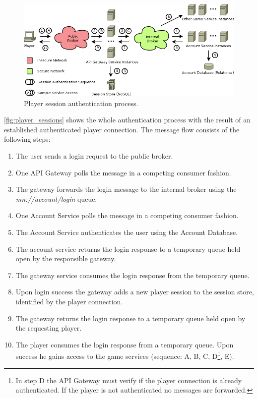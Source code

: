 \begin{figure}
	\centering
  	\includegraphics[width=\textwidth]{images/architecture/PlayerSessions}
	\caption{Player session authentication process.}
	\label{fig:player_sessions}
\end{figure}

\autoref{fig:player_sessions} shows the whole authentication process with the
result of an established authenticated player connection. The message flow
consists of the following steps:

\begin{enumerate}
  \item The user sends a login request to the public broker.
  \item One API Gateway polls the message in a competing consumer fashion.
  \item The gateway forwards the login message to the internal broker using the
  \textit{mn://account/login} queue.
  \item One Account Service polls the message in a competing consumer fashion.
  \item The Account Service authenticates the user using the Account Database.
  \item The account service returns the login response to a temporary queue held
  open by the responsible gateway.
  \item The gateway service consumes the login response from the temporary
  queue.
  \item Upon login success the gateway adds a new player session to the session
  store, identified by the player connection.
  \item The gateway returns the login response to a temporary queue held open by
  the requesting player.
  \item The player consumes the login response from a temporary queue. Upon
  success he gains access to the game services (sequence: A, B, C, D\footnote{In
  step D the API Gateway must verify if the player connection is already
  authenticated. If the player is not authenticated no messages are forwarded.},
  E).
\end{enumerate}



